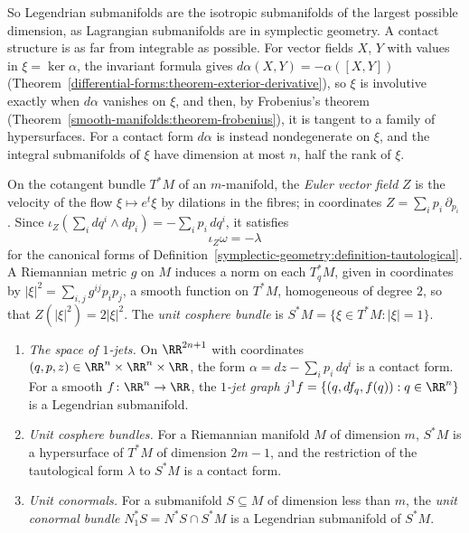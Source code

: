 So Legendrian submanifolds are the isotropic submanifolds of the largest possible dimension, as Lagrangian submanifolds are in symplectic geometry. A contact structure is as far from integrable as
possible. For vector fields $X$, $Y$ with values in $\xi = \ker\alpha$, the invariant formula gives $d\alpha(X, Y) = -\alpha([X, Y])$ (Theorem~\ref{differential-forms:theorem-exterior-derivative}), so $\xi$ is
involutive exactly when $d\alpha$ vanishes on $\xi$, and then, by Frobenius's theorem (Theorem~\ref{smooth-manifolds:theorem-frobenius}), it is tangent to a family of hypersurfaces. For a contact form $d\alpha$ is
instead nondegenerate on $\xi$, and the integral submanifolds of $\xi$ have dimension at most $n$, half the rank of $\xi$.

On the cotangent bundle $T^*M$ of an $m$-manifold, the \emph{Euler vector field} $Z$ is the velocity of the flow $\xi \mapsto e^t\xi$ by dilations in the fibres; in coordinates $Z = \sum_ip_i\,\partial_{p_i}$.
Since $\iota_Z(\sum_idq^i \wedge dp_i) = -\sum_ip_i\,dq^i$, it satisfies
\[
\iota_Z\omega = -\lambda
\]
for the canonical forms of Definition~\ref{symplectic-geometry:definition-tautological}. A Riemannian metric $g$ on $M$ induces a norm on each $T^*_qM$, given in coordinates by $|\xi|^2 = \sum_{i,j}g^{ij}p_ip_j$,
a smooth function on $T^*M$, homogeneous of degree $2$, so that $Z(|\xi|^2) = 2|\xi|^2$. The \emph{unit cosphere bundle} is $S^*M = \{\xi \in T^*M : |\xi| = 1\}$.

\begin{proposition}\label{symplectic-geometry:proposition-contact-examples}
\begin{enumerate}
\item \emph{The space of $1$-jets.} On $\RR^{2n+1}$ with coordinates $(q, p, z) \in \RR^n \times \RR^n \times \RR$, the form $\alpha = dz - \sum_ip_i\,dq^i$ is a contact form. For a smooth $f \colon \RR^n \to \RR$, the
\emph{$1$-jet graph} $j^1f = \{(q, df_q, f(q)) : q \in \RR^n\}$ is a Legendrian submanifold.
\item \emph{Unit cosphere bundles.} For a Riemannian manifold $M$ of dimension $m$, $S^*M$ is a hypersurface of $T^*M$ of dimension $2m - 1$, and the restriction of the tautological form $\lambda$ to $S^*M$
is a contact form.
\item \emph{Unit conormals.} For a submanifold $S \subseteq M$ of dimension less than $m$, the \emph{unit conormal bundle} $N^*_1S = N^*S \cap S^*M$ is a Legendrian submanifold of $S^*M$.
\end{enumerate}
\end{proposition}

